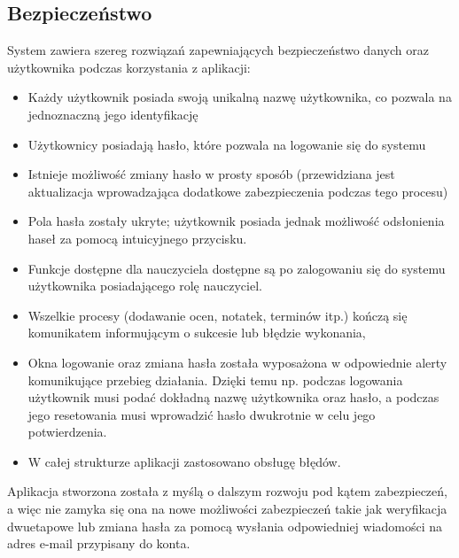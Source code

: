 \subsection{Bezpieczeństwo}
\label{bezpieczeństwo}
System zawiera szereg rozwiązań zapewniających bezpieczeństwo danych oraz użytkownika podczas korzystania z aplikacji:
\begin{itemize}
      \item Każdy użytkownik posiada swoją unikalną nazwę użytkownika, co pozwala na jednoznaczną jego identyfikację
      \item Użytkownicy posiadają hasło, które pozwala na logowanie się do systemu
      \item Istnieje możliwość zmiany hasło w prosty sposób (przewidziana jest aktualizacja wprowadzająca dodatkowe zabezpieczenia podczas tego procesu)
      \item Pola hasła zostały ukryte; użytkownik posiada jednak możliwość odsłonienia haseł za pomocą intuicyjnego przycisku.
      \item Funkcje dostępne dla nauczyciela dostępne są po zalogowaniu się do systemu użytkownika posiadającego rolę nauczyciel.
      \item Wszelkie procesy (dodawanie ocen, notatek, terminów itp.) kończą się komunikatem informującym o sukcesie lub błędzie wykonania,
      \item Okna logowanie oraz zmiana hasła została wyposażona w odpowiednie alerty komunikujące przebieg działania. Dzięki temu np. podczas logowania użytkownik musi podać dokładną nazwę użytkownika oraz hasło, a podczas jego resetowania musi wprowadzić hasło dwukrotnie w celu jego potwierdzenia.
      \item W całej strukturze aplikacji zastosowano obsługę błędów.
\end{itemize}
Aplikacja stworzona została z myślą o dalszym rozwoju pod kątem zabezpieczeń, a więc nie zamyka się ona na nowe możliwości zabezpieczeń takie jak weryfikacja dwuetapowe lub zmiana hasła za pomocą wysłania odpowiedniej wiadomości na adres e-mail przypisany do konta.


